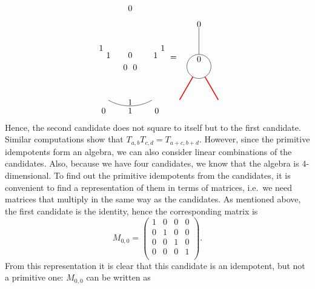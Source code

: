 \begin{equation*}
\begin{tikzpicture}[scale=1,baseline=(current bounding box.center)]
			\draw ([shift=(-120:1.8cm)]0,0) arc (-120:-60:1.8cm);
			\node at (90:.3cm){$0$};\node at (90:2.25cm){$0$};
			\node at (0.2,-0.2) {$0$};
			\node at (-0.2,-0.2) {$0$};
			\node at (-1.1,-2) {$0$};
			\node at (1.1,-2) {$0$};
			\node at (-0.9,0.3) {$1$};
			\node at (1.05,0.3) {$1$};
			\node at (0,-1.65) {$1$};
			\node at (-1.2,0.6) {$1$};
			\node at (1.35,0.6) {$1$};
			\node at (0,-2) {$1$};
		\end{tikzpicture}
		=\begin{tikzpicture}[scale=1,baseline=(current bounding box.center)]
			\draw (0,0) circle (0.5cm);
			\draw[red,line width=0.4mm]
			\foreach \a in {-60, -120} {
				(\a:0.5) -- (\a:1.6)
			};
			\draw[] (90:0.5) -- (90:1.6);
			\node at (90:.3cm){$0$};\node at (90:1.75cm){$0$};
		\end{tikzpicture}\vspace{5pt}
	\end{equation*}
Hence, the second candidate does not square to itself but to the first candidate. 
Similar computations show that $T_{a,b}T_{c,d}=T_{a+c,b+d}$. 
However, since the primitive idempotents form an algebra, we can also consider linear combinations of the candidates. Also, because we have four candidates, we know that the algebra is $4$-dimensional. To find out the primitive idempotents from the candidates, it is convenient to find a representation of them in terms of matrices, i.e.\ we need matrices that multiply in the same way as the candidates. As mentioned above, the first candidate is the identity, hence the corresponding matrix is
	\begin{equation}
		M_{0,0}=\begin{pmatrix}
			1 & 0 & 0 & 0\\
			0 & 1 & 0 & 0\\
			0 & 0 & 1 & 0\\
			0 & 0 & 0 & 1\\
		\end{pmatrix}.
	\end{equation}
From this representation it is clear that this candidate is an idempotent, but not a primitive one: $M_{0,0}$ can be written as
